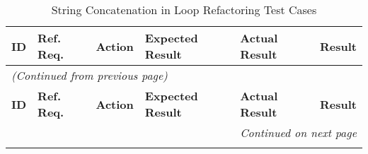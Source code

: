\documentclass[12pt, titlepage]{article}
\begin{document}
\begin{longtable}{c 
  >{\raggedright\arraybackslash}p{1.5cm} 
  >{\raggedright\arraybackslash}p{4.5cm} 
  >{\raggedright\arraybackslash}p{4cm} 
  >{\raggedright\arraybackslash}p{3cm} c}
  \toprule
  \textbf{ID} & \textbf{Ref. Req.} & \textbf{Action} & \textbf{Expected Result} & \textbf{Actual Result} & \textbf{Result} \\ 
  \midrule
  \endfirsthead

  \multicolumn{6}{l}{\textit{(Continued from previous page)}} \\ 
  \toprule
  \textbf{ID} & \textbf{Ref. Req.} & \textbf{Action} & \textbf{Expected Result} & \textbf{Actual Result} & \textbf{Result} \\ 
  \midrule
  \endhead

  \multicolumn{6}{r}{\textit{Continued on next page}} \\
  \endfoot

  \bottomrule
  \caption{String Concatenation in Loop Refactoring Test Cases}
  \label{table:string_concat_refactoring_tests}
  \endlastfoot


\end{longtable}
\end{document}
